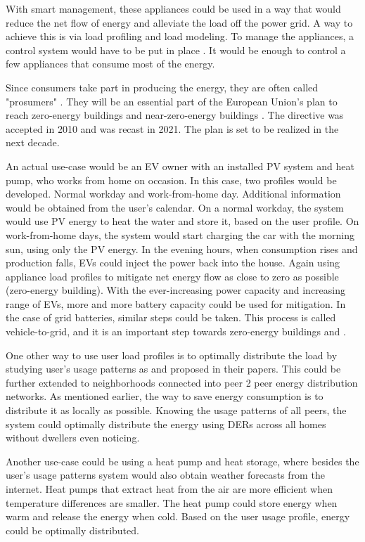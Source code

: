 With smart management, these appliances could be used in a way that would reduce the net flow of energy and alleviate the load off the power grid.
A way to achieve this is via load profiling and load modeling. 
To manage the appliances, a control system would have to be put in place \cite{DirectLoadControll2021}.
It would be enough to control a few appliances that consume most of the energy. 

Since consumers take part in producing the energy, they are often called "prosumers" \cite{Prosumer2016}.
They will be an essential part of the European Union's plan to reach zero-energy buildings
and near-zero-energy buildings \cite{eu2021}. The directive was accepted in 2010 and was recast in 2021.
The plan is set to be realized in the next decade.

An actual use-case would be an EV owner with an installed PV system and heat pump, who works from home on occasion.
In this case, two profiles would be developed. Normal workday and work-from-home day.
Additional information would be obtained from the user's calendar. 
On a normal workday, the system would use PV energy to heat the water and store it, based on the user profile.
On work-from-home days, the system would start charging the car with the morning sun, using only the PV energy. 
In the evening hours, when consumption rises and production falls, EVs could inject the power back into the house. 
Again using appliance load profiles to mitigate net energy flow as close to zero as possible (zero-energy building).
With the ever-increasing power capacity and increasing range of EVs, more and more battery capacity could be used for mitigation. 
In the case of grid batteries, similar steps could be taken.
This process is called vehicle-to-grid, and it is an important step towards zero-energy buildings \cite{EV2018} and \cite{EV2020}.

One other way to use user load profiles is to optimally distribute the load by studying user's usage patterns as \cite{Chuan2014} and \cite{shift2015} proposed in their papers. 
This could be further extended to neighborhoods connected into peer 2 peer energy distribution networks.
As mentioned earlier, the way to save energy consumption is to distribute it as locally as possible. 
Knowing the usage patterns of all peers, the system could optimally distribute the energy using DERs across all homes without dwellers even noticing.

Another use-case could be using a heat pump and heat storage,
where besides the user's usage patterns system would also obtain weather forecasts from the internet.
Heat pumps that extract heat from the air are more efficient when temperature differences are smaller. 
The heat pump could store energy when warm and release the energy when cold.
Based on the user usage profile, energy could be optimally distributed.

